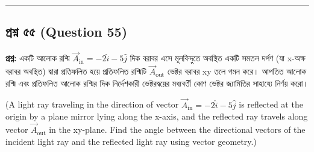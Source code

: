 \documentclass[12pt]{article}
\begin{document}
\vspace{0.8cm}

\noindent\rule{\textwidth}{1pt}
\subsection*{প্রশ্ন ৫৫ (Question 55)}

\textbf{প্রশ্ন:} একটি আলোক রশ্মি $\vec{A}_{\text{in}} = -2\hat{i} - 5\hat{j}$ দিক বরাবর এসে মূলবিন্দুতে অবস্থিত একটি সমতল দর্পণ (যা x-অক্ষ বরাবর অবস্থিত) দ্বারা প্রতিফলিত হয়ে প্রতিফলিত রশ্মিটি $\vec{A}_{\text{out}}$ ভেক্টর বরাবর xy তলে গমন করে। আপতিত আলোক রশ্মি এবং প্রতিফলিত আলোক রশ্মির দিক নির্দেশকারী ভেক্টরদ্বয়ের মধ্যবর্তী কোণ ভেক্টর জ্যামিতির সাহায্যে নির্ণয় করো।

(A light ray traveling in the direction of vector $\vec{A}_{\text{in}} = -2\hat{i} - 5\hat{j}$ is reflected at the origin by a plane mirror lying along the x-axis, and the reflected ray travels along vector $\vec{A}_{\text{out}}$ in the xy-plane. Find the angle between the directional vectors of the incident light ray and the reflected light ray using vector geometry.)

\begin{center}
\end{center}
\end{document}
